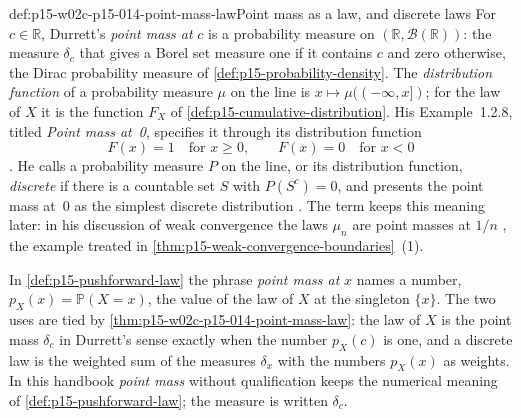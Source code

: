 \begin{hbdefinition}{def:p15-w02c-p15-014-point-mass-law}{Point mass as a law, and discrete laws}
For \(c\in\mathbb R\), Durrett's \emph{point mass at} \(c\) is a
probability measure on \((\mathbb R,\mathcal B(\mathbb R))\): the
measure \(\delta_c\) that gives a Borel set measure one if it contains
\(c\) and zero otherwise, the Dirac probability measure of
\cref{def:p15-probability-density}. The \emph{distribution function}
of a probability measure \(\mu\) on the line is
\(x\mapsto\mu((-\infty,x])\); for the law of \(X\) it is the function
\(F_X\) of \cref{def:p15-cumulative-distribution}. His Example~1.2.8, titled
\emph{Point mass at~0}, specifies it through its distribution function
\[
 F(x)=1\quad\text{for }x\geq0,\qquad F(x)=0\quad\text{for }x<0
\]
\cite[Example~1.2.8, p.~13]{DurrettPTEAuthor2019}. He calls a
probability measure \(P\) on the line, or its distribution function,
\emph{discrete} if there is a countable set \(S\) with \(P(S^c)=0\), and
presents the point mass at~0 as the simplest discrete distribution
\cite[p.~13]{DurrettPTEAuthor2019}. The term keeps this meaning later:
in his discussion of weak convergence the laws \(\mu_n\) are point masses
at \(1/n\) \cite[sec.~3.2, p.~117]{DurrettPTEAuthor2019}, the example
treated in \cref{thm:p15-weak-convergence-boundaries}~(1).

In \cref{def:p15-pushforward-law} the phrase \emph{point mass at}
\(x\) names a number, \(p_X(x)=\mathbb P(X=x)\), the value of the law
of \(X\) at the singleton \(\{x\}\). The two uses are tied by
\cref{thm:p15-w02c-p15-014-point-mass-law}: the law of \(X\) is the
point mass \(\delta_c\) in Durrett's sense exactly when the number
\(p_X(c)\) is one, and a discrete law is the weighted sum of the
measures \(\delta_x\) with the numbers \(p_X(x)\) as weights. In this
handbook \emph{point mass} without qualification keeps the numerical
meaning of \cref{def:p15-pushforward-law}; the measure is written
\(\delta_c\).
\end{hbdefinition}

